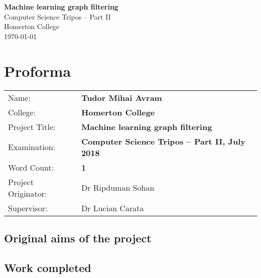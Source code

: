 \documentclass[12pt,a4paper,twoside,openright]{report}
\begin{document}




\pagestyle{empty}


\vspace*{60mm}
\begin{center}
	\Huge
	\textbf{Machine learning graph filtering} \\[5mm]
	Computer Science Tripos -- Part II \\[5mm]
	Homerton College \\[5mm]
	\today  %
\end{center}


\pagestyle{plain}

\chapter*{Proforma}

{\large
	\begin{tabular}{ll}
		Name:               & \bf Tudor Mihai Avram                     \\
		College:            & \bf Homerton College                    \\
		Project Title:      & \bf Machine learning graph filtering \\
		Examination:        & \bf Computer Science Tripos -- Part II, July 2018  \\
		Word Count:         & \bf 1\footnotemark[1] \\
		Project Originator: & Dr Ripduman Sohan                   \\
		Supervisor:         & Dr Lucian Carata                    \\ 
	\end{tabular}
}


\section*{Original aims of the project}
\section*{Work completed}
\end{document}
